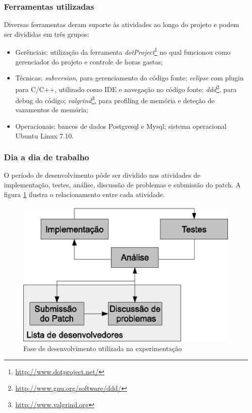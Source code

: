 \subsubsection{Ferramentas utilizadas}

Diversas ferramentas deram suporte às atividades ao longo do projeto e podem ser divididas em três grupos: 
\begin{itemize}
 \item Gerênciais: utilização da ferramenta \textit{dotProject}\footnote{\url{http://www.dotproject.net/}} no qual funcionou como gerenciador do projeto e controle de horas gastas;
 \item Técnicas: \textit{subversion}, para gerenciamento do código fonte; \textit{eclipse} com plugin para C/C++, utilizado como IDE e navegação no código fonte; \textit{ddd}\footnote{\url{http://www.gnu.org/software/ddd/}}, para debug do código; \textit{valgrind}\footnote{\url{http://www.valgrind.org}}, para profiling de memória e deteção de vazamentos de memória;
 \item Operacionais: bancos de dados Postgresql e Mysql; sistema operacional Ubuntu Linux 7.10.
\end{itemize}

\subsubsection{Dia a dia de trabalho}
O período de desenvolvimento pôde ser dividido nas atividades de implementação, testes, análise, discussão de problemas e submissão do patch. A figura \ref{fig:resolucao_problemas} ilustra o relacionamento entre cada atividade. 
\begin{figure}[h]
 \centering
 \includegraphics{../../doc/diagramas/resolucao_problemas.eps}
 \caption[Fase de desenvolvimento]{Fase de desenvolvimento utilizada na experimentação}
 \label{fig:resolucao_problemas}
\end{figure}

